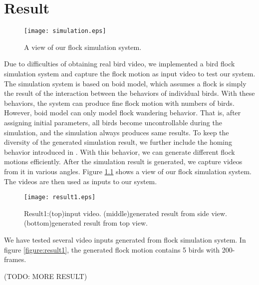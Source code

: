\chapter{Result}


\begin{figure}[h]
 \begin{center}
  \texttt{[image: simulation.eps]}
 \end{center}
 \caption{A view of our flock simulation system.}
 \label{figure:simulation}
\end{figure}


Due to difficulties of obtaining real bird video, we implemented a bird flock simulation system and capture the flock motion as input video to test our system. The simulation system is based on boid model, which assumes a flock is simply the result of the interaction between the behaviors of individual birds. With these behaviors, the system can produce fine flock motion with numbers of birds. However, boid model can only model flock wandering behavior. That is, after assigning initial parameters, all birds become uncontrollable during the simulation, and the simulation always produces same results. To keep the diversity of the generated simulation result, we further include the homing behavior introduced in \cite{Shape,OB1}. With this behavior, we can generate different flock motions efficiently. After the simulation result is generated, we capture videos from it in various angles. Figure \ref{figure:simulation} shows a view of our flock simulation system. The videos are then used as inputs to our system.


\begin{figure}[h]
 \begin{center}
  \texttt{[image: result1.eps]}
 \end{center}
 \caption{Result1:(top)input video. (middle)generated result from side view. (bottom)generated result from top view.}
 \label{figure:result1_side}
\end{figure}


We have tested several video inputs generated from flock simulation system. In figure \ref{figure:result1}, the generated flock motion contains 5 birds with 200-frames.


(TODO: MORE RESULT)
